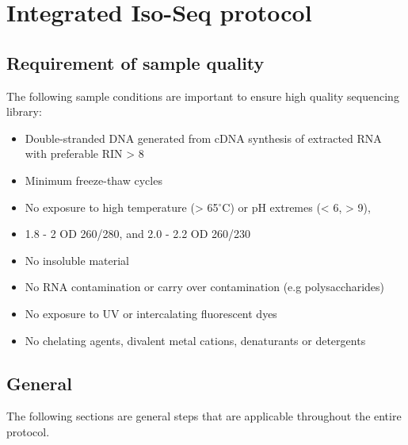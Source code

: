 \cleardoublepage
\chapter{Integrated Iso-Seq protocol}\label{app_longread_protocol}

\stoptocwriting

\section{Requirement of sample quality}
The following sample conditions are important to ensure high quality sequencing library: 
\begin{itemize}
	\item Double-stranded DNA generated from cDNA synthesis of extracted RNA with preferable RIN > 8
	\item Minimum freeze-thaw cycles 
	\item No exposure to high temperature (> 65$^{\circ}$C) or pH extremes (< 6, > 9), 
	\item 1.8 - 2 OD 260/280, and 2.0 - 2.2 OD 260/230 
	\item No insoluble material  
	\item No RNA contamination or carry over contamination (e.g polysaccharides)
	\item No exposure to UV or intercalating fluorescent dyes 
	\item No chelating agents, divalent metal cations, denaturants or detergents
	
\end{itemize}

\section{General}
The following sections are general steps that are applicable throughout the entire protocol. 

